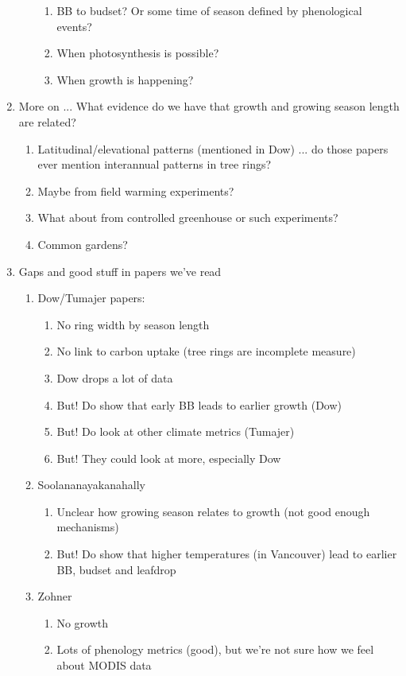 \documentclass[11pt,letter]{article}
\begin{document}
\begin{enumerate}
\begin{enumerate}
\begin{enumerate}
\item BB to budset? Or some time of season defined by phenological events?
\item When photosynthesis is possible?
\item When growth is happening?
\end{enumerate}
\end{enumerate}
\item More on ... What evidence do we have that growth and growing season length are related?
\begin{enumerate}
\item Latitudinal/elevational patterns (mentioned in Dow) ... do those papers ever mention interannual patterns in tree rings?
\item Maybe from field warming experiments?
\item What about from controlled greenhouse or such experiments?
\item Common gardens?
\end{enumerate}
\item Gaps and good stuff in papers we've read
\begin{enumerate}
\item Dow/Tumajer papers:
\begin{enumerate}
\item No ring width by season length
\item No link to carbon uptake (tree rings are incomplete measure)
\item Dow drops a lot of data
\item But! Do show that early BB leads to earlier growth (Dow)
\item But! Do look at other climate metrics (Tumajer)
\item But! They could look at more, especially Dow
\end{enumerate}
\item Soolananayakanahally
\begin{enumerate}
\item Unclear how growing season relates to growth (not good enough mechanisms)
\item But! Do show that higher temperatures (in Vancouver) lead to earlier BB, budset and leafdrop
\end{enumerate}
\item Zohner
\begin{enumerate}
\item No growth
\item Lots of phenology metrics (good), but we're not sure how we feel about MODIS data
\end{enumerate}
\end{enumerate}
\end{enumerate}
\end{document}
